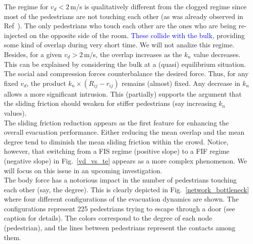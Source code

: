 \documentclass[preprint,12pt]{elsarticle}
\begin{document}
The regime for $v_d<2\,$m/s is qualitatively different from the clogged regime since most of the 
pedestrians are not touching each other (as was already observed in Ref~\cite{dorso_2005,dorso_2011}). The only pedestrians who touch each 
other are the ones who are being re-injected on the opposite side of the room.
\textcolor{blue}{These collide with the bulk}, providing some kind of overlap during very short time. We will
not analize this regime.\\

Besides, for a given $v_d>2\,$m/s, the overlap increases as the $k_n$ value decreases. 
This can be explained by considering the bulk at a (quasi) equilibrium situation. 
The social and compression forces counterbalance the desired force. Thus, for any fixed $v_d$,
the product $k_n \times (R_{ij}-r_{ij})$ remains (almost) fixed. Any decrease in $k_n$
allows a more significant intrusion. This (partially) supports the argument that
the sliding friction should weaken for stiffer pedestrians (say increasing
$k_n$ values). \\  


The sliding friction reduction appears as the first feature for enhancing
the overall evacuation performance. Either reducing the mean overlap and the mean degree
tend to diminish the mean sliding 
friction within the crowd. 
Notice, however, that switching from a FIS regime (positive slope) to a  FIF 
regime (negative slope) in Fig.~\ref{vd_vs_te} appears as a more complex 
phenomenon. We will focus on this issue in an upcoming investigation.\\

The body force 
has a notorious impact in the number of pedestrians touching each other (say, 
the degree). This is clearly depicted in Fig.~\ref{network_bottleneck} where 
four different configurations of the evacuation dynamics are shown. The 
configurations represent 225 pedestrians trying to escape through a door (see 
caption for details). The colors correspond to the degree of each node 
(pedestrian), and the lines between pedestrians represent the contacts among 
them.\\
\end{document}
